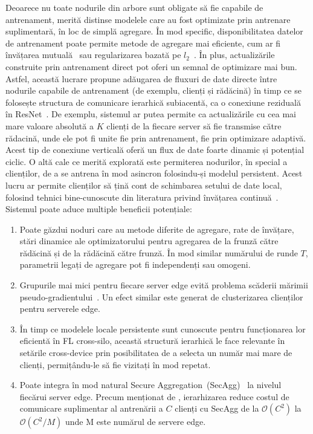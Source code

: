 Deoarece nu toate nodurile din arbore sunt obligate să fie capabile de antrenament, merită distinse modelele care au fost optimizate prin antrenare suplimentară, în loc de simplă agregare. În mod specific, disponibilitatea datelor de antrenament poate permite metode de agregare mai eficiente, cum ar fi învățarea mutuală~\citep{DeepMutualLearning} sau regularizarea bazată pe $l_2$~\citep{Ditto}. În plus, actualizările construite prin antrenament direct pot oferi un semnal de optimizare mai bun. Astfel, această lucrare propune adăugarea de fluxuri de date directe între nodurile capabile de antrenament (de exemplu, clienți și rădăcină) în timp ce se folosește structura de comunicare ierarhică subiacentă, ca o conexiune reziduală în ResNet~\citep{ResNet}. De exemplu, sistemul ar putea permite ca actualizările cu cea mai mare valoare absolută a $K$ clienți de la fiecare server să fie transmise către rădacină, unde ele pot fi unite fie prin antrenament, fie prin optimizare adaptivă. Acest tip de conexiune verticală oferă un flux de date foarte dinamic și potențial ciclic. O altă cale ce merită explorată este permiterea nodurilor, în special a clienților, de a se antrena în mod asincron folosindu-și modelul persistent. Acest lucru ar permite clienților să țină cont de schimbarea setului de date local, folosind tehnici bine-cunoscute din literatura privind învățarea continuă~\citep{ContinualLearningSurvey,kirkpatrick2017overcoming}. Sistemul poate aduce multiple beneficii potențiale:
\begin{enumerate}
    \item Poate găzdui noduri care au metode diferite de agregare, rate de învățare, stări dinamice ale optimizatorului pentru agregarea de la frunză către rădăcină și de la rădăcină către frunză. În mod similar numărului de runde $T$, parametrii legați de agregare pot fi independenți sau omogeni.
    \item Grupurile mai mici pentru fiecare server edge evită problema scăderii mărimii pseudo-gradientului~\citep{LargeCohorts}. Un efect similar este generat de clusterizarea clienților pentru serverele edge.
    \item În timp ce modelele locale persistente sunt cunoscute pentru funcționarea lor eficientă în FL cross-silo, această structură ierarhică le face relevante în setările cross-device prin posibilitatea de a selecta un număr mai mare de clienți, permițându-le să fie vizitați în mod repetat.
    \item Poate integra în mod natural Secure Aggregation~(SecAgg)~\citep{SecAggOG} la nivelul fiecărui server edge. Precum menționat de \citet{ScaleSystemDesign}, ierarhizarea reduce costul de comunicare suplimentar al antrenării a $C$ clienți cu SecAgg de la $\mathcal{O}(C^2)$ la $\mathcal{O}(C^2/M)$ unde M este numărul de servere edge.

\end{enumerate}

